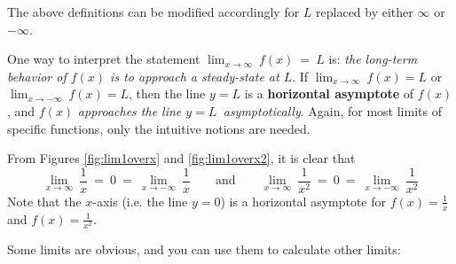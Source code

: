 
\noindent The above definitions can be modified accordingly for $L$ replaced by
either $\infty$ or $-\infty$.

\noindent One way to interpret the statement
$\displaystyle\lim_{x \to \infty} ~f(x) ~=~ L$ is: \emph{the
long-term behavior of $f(x)$ is to approach a steady-state at $L$}.
If $\displaystyle\lim_{x \to \infty} ~f(x) = L $ or
$\displaystyle\lim_{x \to -\infty} ~f(x) = L$, then the line $y=L$ is a
\textbf{horizontal asymptote} of $f(x)$,
and $f(x)$ \emph{approaches the line $y=L\,$ asymptotically}. 
Again, for most limits of specific functions, only the intuitive notions are
needed.

\begin{exmp}\label{exmp:lim1overxandx2inf}
\noindent From Figures \ref{fig:lim1overx} and \ref{fig:lim1overx2}, it is clear
that
\[
\lim_{x \to \infty}~\dfrac{1}{x} ~=~ 0 ~=~ \lim_{x \to -\infty}~\dfrac{1}{x} \qquad\text{and}\qquad
\lim_{x \to \infty}~\dfrac{1}{x^2} ~=~ 0 ~=~ \lim_{x \to -\infty}~\dfrac{1}{x^2}
\]
Note that the $x$-axis (i.e. the line $y = 0$) is a horizontal asymptote for
$f(x) = \frac{1}{x}$ and $f(x) = \frac{1}{x^2}$.
\end{exmp}
\divider
\vspace{3mm}

Some limits are obvious, and you can use them to calculate other limits:

\statecomment{\vspace{-1mm}\[
\lim_{x \to \infty} ~x^n ~=~ \begin{cases}
                            \infty & \text{for any real $n > 0$}\\
                            0 & \text{for any real $n < 0$}
                           \end{cases}
\qquad\quad
\lim_{x \to -\infty} ~x^n ~=~ \begin{cases}
                            \infty & \text{for } n = 2, 4, 6, 8, \ldots\\
                            -\infty & \text{for } n = 1, 3, 5, 7, \ldots
                           \end{cases}
\]
\[
\lim_{x \to \infty} ~e^x ~=~ \infty \qquad\quad
\lim_{x \to -\infty} ~e^x ~=~ 0 \qquad\quad
\lim_{x \to \infty} ~e^{-x} ~=~ 0 \qquad\quad
\lim_{x \to -\infty} ~e^{-x} ~=~ \infty
\]
\[
\lim_{x \to \infty} ~\ln\,x ~=~ \infty \qquad\qquad
\lim_{x \to 0+} ~\ln\,x ~=~ -\infty
\]}


